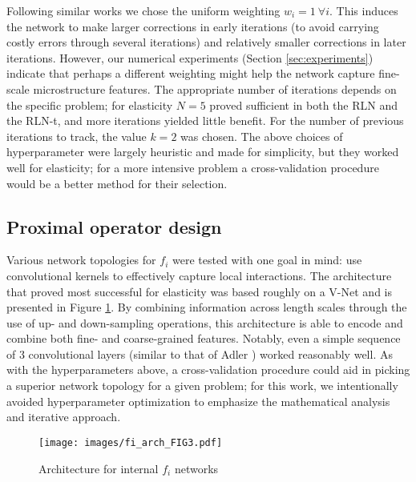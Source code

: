 \documentclass[3p, preprint]{elsarticle}
\newenvironment{revision} {} {}
\begin{document}
Following similar works \cite{putzky2017} we chose the uniform weighting $w_i = 1 ~ \forall i$. This induces the network to make larger corrections in early iterations (to avoid carrying costly errors through several iterations) and relatively smaller corrections in later iterations. However, our numerical experiments (Section \ref{sec:experiments}) indicate that perhaps a different weighting might help the network capture fine-scale microstructure features. The appropriate number of iterations depends on the specific problem; for elasticity $N=5$ proved sufficient in both the RLN and the RLN-t, and more iterations yielded little benefit. \begin {revision} For the number of previous iterations to track, the value $k=2$ was chosen. The above choices of hyperparameter were largely heuristic and made for simplicity, but they worked well for elasticity; for a more intensive problem a cross-validation procedure would be a better method for their selection.\end{revision}

\subsection{Proximal operator design}
Various network \begin{revision} topologies\end{revision} for $f_i$ \cite{adler2018, putzky2017, milletari2016vnet} were tested with one goal in mind: use convolutional kernels to effectively capture local interactions. The architecture that proved most successful for elasticity was based roughly on a V-Net \cite{milletari2016vnet} and is presented in Figure \ref{fig:fi_arch}. By combining information across length scales through the use of up- and down-sampling operations, this architecture is able to encode and combine both fine- and coarse-grained features. Notably, even a simple sequence of 3 convolutional layers (similar to that of Adler \cite{adler2018}) worked reasonably well. \begin{revision}As with the hyperparameters above, a cross-validation procedure could aid in picking a superior network topology for a given problem; for this work, we intentionally avoided hyperparameter optimization to emphasize the mathematical analysis and iterative approach.\end{revision}

\begin{figure}
    \centering
    \texttt{[image: images/fi\_arch\_FIG3.pdf]}
    \caption{Architecture for internal $f_i$ networks}
    \label{fig:fi_arch}
\end{figure}
\end{document}
